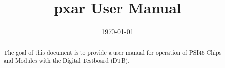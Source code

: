 \documentclass{scrartcl}
\title{pxar User Manual} %
\author{
} %
\date{\today} %
\begin{document}
\maketitle %


\begin{abstract}
The goal of this document is to provide a user manual for operation of
PSI46 Chips and Modules with the Digital Testboard (DTB).
\end{abstract}

\newpage
\tableofcontents

\newpage







\end{document}
